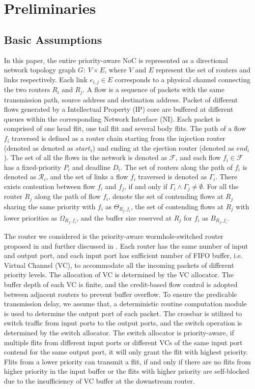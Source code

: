 \documentclass[preprint]{elsarticle}
\begin{document}
\section{Preliminaries}\label{model}
\subsection{Basic Assumptions}
In this paper, the entire priority-aware NoC is represented as a directional network topology graph $G:\ V\times E$, where $V$ and $E$ represent the set of routers and links respectively. Each link $e_{i,j}\in E$ corresponds to a physical channel connecting the two routers $R_i$ and $R_j$. A flow is a sequence of packets with the same transmission path, source address and destination address. Packet of different flows generated by a Intellectual Property (IP) core are buffered at different queues within the corresponding Network Interface (NI). Each packet is comprised of one head flit, one tail flit and several body flits. The path of a flow $f_i$ traversed is defined as a router chain starting from the injection router (denoted as denoted as $start_i$) and ending at the ejection router (denoted as $end_i$). The set of all the flows in the network is denoted as $\mathcal{F}$, and each flow $f_i\in\mathcal{F}$ has a fixed-priority $P_i$ and deadline $D_i$. The set of routers along the path of $f_i$ is denoted as $\mathcal{R}_i$, and the set of links a flow $f_i$ traversed is denoted as $\Gamma_i$. There exists contention between flow $f_i$ and $f_j$, if and only if $\Gamma_i\wedge\Gamma_j\neq\emptyset$. For all the router $R_j$ along the path of flow $f_i$, denote the set of contending flows at $R_j$ sharing the same priority with $f_i$ as $\Theta_{R_j,f_i}$, the set of contending flows at $R_j$ with lower priorities as $\Omega_{R_j,f_i}$, and the buffer size reserved at $R_j$ for $f_i$ as $B_{R_j,f_i}$.

The router we considered is the priority-aware wormhole-switched router proposed in \cite{Shi:2008:RCA:1397757.1397996} and further discussed in \cite{627905}\cite{707545}\cite{73}. Each router has the same number of input and output port, and each input port has sufficient number of FIFO buffer, i.e. Virtual Channel (VC), to accommodate all the incoming packets of different priority levels. The allocation of VC is determined by the VC allocator. The buffer depth of each VC is finite, and the credit-based flow control \cite{DaTo04} is adopted between adjacent routers to prevent buffer overflow. To ensure the predicable transmission delay, we assume that, a deterministic routine computation module is used to determine the output port of each packet. The crossbar is utilized to switch traffic from input ports to the output ports, and the switch operation is determined by the switch allocator. The switch allocator is priority-aware, if multiple flits from different input ports or different VCs of the same input port contend for the same output port, it will only grant the flit with highest priority. Flits from a lower priority can transmit a flit, if and only if there are no flits from higher priority in the input buffer or the flits with higher priority are self-blocked due to the insufficiency of VC buffer at the downstream router.
\end{document}
